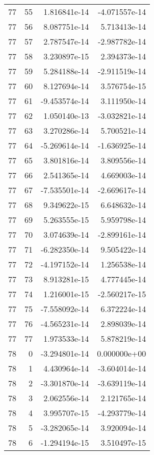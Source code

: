 \begin{tabular}{rrrr}
  77 &   55 &  1.816841e-14 & -4.071557e-14 \\
  77 &   56 &  8.087751e-14 &  5.713413e-14 \\
  77 &   57 &  2.787547e-14 & -2.987782e-14 \\
  77 &   58 &  3.230897e-15 &  2.394373e-14 \\
  77 &   59 &  5.284188e-14 & -2.911519e-14 \\
  77 &   60 &  8.127694e-14 &  3.576754e-15 \\
  77 &   61 & -9.453574e-14 &  3.111950e-14 \\
  77 &   62 &  1.050140e-13 & -3.032821e-14 \\
  77 &   63 &  3.270286e-14 &  5.700521e-14 \\
  77 &   64 & -5.269614e-14 & -1.636925e-14 \\
  77 &   65 &  3.801816e-14 &  3.809556e-14 \\
  77 &   66 &  2.541365e-14 &  4.669003e-14 \\
  77 &   67 & -7.535501e-14 & -2.669617e-14 \\
  77 &   68 &  9.349622e-15 &  6.648632e-14 \\
  77 &   69 &  5.263555e-15 &  5.959798e-14 \\
  77 &   70 &  3.074639e-14 & -2.899161e-14 \\
  77 &   71 & -6.282350e-14 &  9.505422e-14 \\
  77 &   72 & -4.197152e-14 &  1.256538e-14 \\
  77 &   73 &  8.913281e-15 &  4.777445e-14 \\
  77 &   74 &  1.216001e-15 & -2.560217e-15 \\
  77 &   75 & -7.558092e-14 &  6.372224e-14 \\
  77 &   76 & -4.565231e-14 &  2.898039e-14 \\
  77 &   77 &  1.973533e-14 &  5.878219e-14 \\
  78 &    0 & -3.294801e-14 &  0.000000e+00 \\
  78 &    1 &  4.430964e-14 & -3.604014e-14 \\
  78 &    2 & -3.301870e-14 & -3.639119e-14 \\
  78 &    3 &  2.062556e-14 &  2.121765e-14 \\
  78 &    4 &  3.995707e-15 & -4.293779e-14 \\
  78 &    5 & -3.282065e-14 &  3.920094e-14 \\
  78 &    6 & -1.294194e-15 &  3.510497e-15 \\

\end{tabular}
